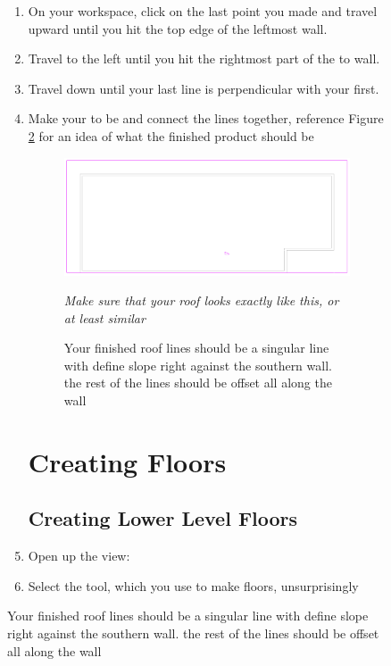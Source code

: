 \documentclass{tufte-book} %
\begin{document}
\begin{figure}
\begin{enumerate}
	
	\item On your workspace, click on the last point you made and travel upward until you hit the top edge of the leftmost wall.
	\item Travel to the left until you hit the rightmost part of the to wall. 
	\item Travel down until your last line is perpendicular with your first. 
	\item Make your  to be  and connect the lines together, reference Figure \ref{fig:revrooflines} for an idea of what the finished product should be 
	
	\begin{figure}
		\includegraphics[width=\linewidth]{revitrooflines.PNG}
		\caption[Finished Roof Lines]{Your finished roof lines should be a singular line with define slope right against the southern wall. the rest of the lines should be offset  all along the wall}
		\emph{Make sure that your roof looks exactly like this, or at least similar}
		\label{fig:revrooflines}
	\end{figure}
	

	\section{Creating Floors}
	\subsection{Creating Lower Level Floors}
	\item Open up the view: 
	\item Select the  tool, which you use to make floors, unsurprisingly
	

\end{enumerate}
\end{figure}
\end{document}
